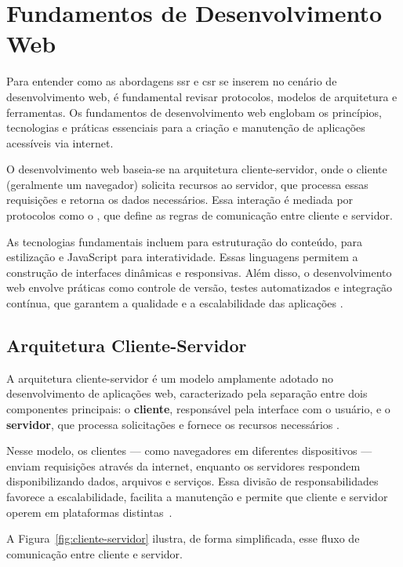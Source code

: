 \section{Fundamentos de Desenvolvimento Web}
\label{sec:fundamentos-devweb}
Para entender como as abordagens \acrshort{ssr} e \acrshort{csr} se inserem no cenário de desenvolvimento web, é fundamental revisar protocolos, modelos de arquitetura e ferramentas.
Os fundamentos de desenvolvimento web englobam os princípios, tecnologias e práticas essenciais para a criação e manutenção de aplicações acessíveis via internet. 

O desenvolvimento web baseia-se na arquitetura cliente-servidor, onde o cliente (geralmente um navegador) solicita recursos ao servidor, que processa essas requisições e retorna os dados necessários. Essa interação é mediada por protocolos como o 
 , que define as regras de comunicação entre cliente e servidor.

As tecnologias fundamentais incluem  para estruturação do conteúdo,  para estilização e JavaScript para interatividade. Essas linguagens permitem a construção de interfaces dinâmicas e responsivas. Além disso, o desenvolvimento web envolve práticas como controle de versão, testes automatizados e integração contínua, que garantem a qualidade e a escalabilidade das aplicações \cite{fundamentosDevWeb}. 

\subsection{Arquitetura Cliente-Servidor}
\label{subsec:Arquitetura Cliente-Servidor}

A arquitetura cliente-servidor é um modelo amplamente adotado no desenvolvimento de aplicações web, caracterizado pela separação entre dois componentes principais: o \textbf{cliente}, responsável pela interface com o usuário, e o \textbf{servidor}, que processa solicitações e fornece os recursos necessários \cite{clienteServidorControlNet}.

Nesse modelo, os clientes — como navegadores em diferentes dispositivos — enviam requisições através da internet, enquanto os servidores respondem disponibilizando dados, arquivos e serviços. Essa divisão de responsabilidades favorece a escalabilidade, facilita a manutenção e permite que cliente e servidor operem em plataformas distintas~\cite{fundamentosDevWeb}.

A Figura~\ref{fig:cliente-servidor} ilustra, de forma simplificada, esse fluxo de comunicação entre cliente e servidor.

